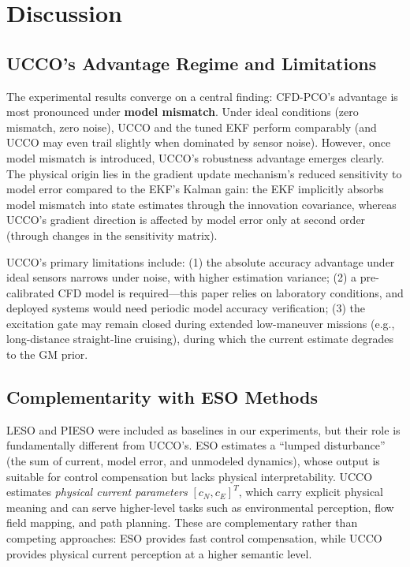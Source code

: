 \section{Discussion}

\subsection{UCCO's Advantage Regime and Limitations}

The experimental results converge on a central finding: CFD-PCO's advantage is most pronounced under \textbf{model mismatch}. Under ideal conditions (zero mismatch, zero noise), UCCO and the tuned EKF perform comparably (and UCCO may even trail slightly when dominated by sensor noise). However, once model mismatch is introduced, UCCO's robustness advantage emerges clearly. The physical origin lies in the gradient update mechanism's reduced sensitivity to model error compared to the EKF's Kalman gain: the EKF implicitly absorbs model mismatch into state estimates through the innovation covariance, whereas UCCO's gradient direction is affected by model error only at second order (through changes in the sensitivity matrix).

UCCO's primary limitations include: (1) the absolute accuracy advantage under ideal sensors narrows under noise, with higher estimation variance; (2) a pre-calibrated CFD model is required---this paper relies on laboratory conditions, and deployed systems would need periodic model accuracy verification; (3) the excitation gate may remain closed during extended low-maneuver missions (e.g., long-distance straight-line cruising), during which the current estimate degrades to the GM prior.

\subsection{Complementarity with ESO Methods}

LESO and PIESO were included as baselines in our experiments, but their role is fundamentally different from UCCO's. ESO estimates a ``lumped disturbance'' (the sum of current, model error, and unmodeled dynamics), whose output is suitable for control compensation but lacks physical interpretability. UCCO estimates \emph{physical current parameters} $[c_N,c_E]^T$, which carry explicit physical meaning and can serve higher-level tasks such as environmental perception, flow field mapping, and path planning. These are complementary rather than competing approaches: ESO provides fast control compensation, while UCCO provides physical current perception at a higher semantic level.

